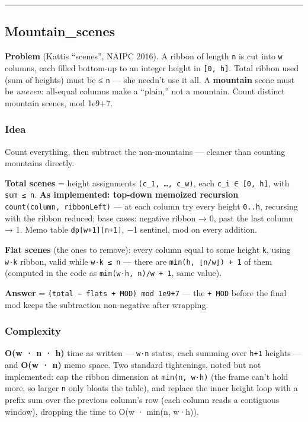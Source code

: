 \documentclass[
  10pt,
  letterpaper,
  onecolumn]{article}
\begin{document}
\begin{center}\rule{0.5\linewidth}{0.5pt}\end{center}

\hypertarget{mountain_scenes}{%
\subsection{Mountain\_scenes}\label{mountain_scenes}}

\textbf{Problem} (Kattis ``scenes'', NAIPC 2016). A ribbon of length
\texttt{n} is cut into \texttt{w} columns, each filled bottom-up to an
integer height in \texttt{{[}0,\ h{]}}. Total ribbon used (sum of
heights) must be ≤ \texttt{n} --- she needn't use it all. A
\textbf{mountain} scene must be \emph{uneven}: all-equal columns make a
``plain,'' not a mountain. Count distinct mountain scenes, mod 1e9+7.

\hypertarget{idea-12}{%
\subsubsection{Idea}\label{idea-12}}

Count everything, then subtract the non-mountains --- cleaner than
counting mountains directly.

\textbf{Total scenes} = height assignments \texttt{(c\_1,\ …,\ c\_w)},
each \texttt{c\_i\ ∈\ {[}0,\ h{]}}, with \texttt{sum\ ≤\ n}. \textbf{As
implemented: top-down memoized recursion}
\texttt{count(column,\ ribbonLeft)} --- at each column try every height
\texttt{0..h}, recursing with the ribbon reduced; base cases: negative
ribbon → 0, past the last column → 1. Memo table
\texttt{dp{[}w+1{]}{[}n+1{]}}, −1 sentinel, mod on every addition.

\textbf{Flat scenes} (the ones to remove): every column equal to some
height \texttt{k}, using \texttt{w·k} ribbon, valid while
\texttt{w·k\ ≤\ n} --- there are \texttt{min(h,\ ⌊n/w⌋)\ +\ 1} of them
(computed in the code as \texttt{min(w·h,\ n)/w\ +\ 1}, same value).

\textbf{Answer} = \texttt{(total\ −\ flats\ +\ MOD)\ mod\ 1e9+7} --- the
\texttt{+\ MOD} before the final mod keeps the subtraction non-negative
after wrapping.

\hypertarget{complexity-12}{%
\subsubsection{Complexity}\label{complexity-12}}

\textbf{O(w · n · h)} time as written --- \texttt{w·n} states, each
summing over \texttt{h+1} heights --- and \textbf{O(w · n)} memo space.
Two standard tightenings, noted but not implemented: cap the ribbon
dimension at \texttt{min(n,\ w·h)} (the frame can't hold more, so larger
\texttt{n} only bloats the table), and replace the inner height loop
with a prefix sum over the previous column's row (each column reads a
contiguous window), dropping the time to O(w · min(n, w·h)).
\end{document}
